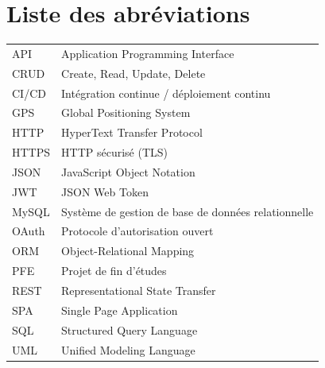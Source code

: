 \chapter*{Liste des abréviations}

\begin{tabular}{@{}p{3.2cm}p{11cm}@{}}
API & Application Programming Interface \\
CRUD & Create, Read, Update, Delete \\
CI/CD & Intégration continue / déploiement continu \\
GPS & Global Positioning System \\
HTTP & HyperText Transfer Protocol \\
HTTPS & HTTP sécurisé (TLS) \\
JSON & JavaScript Object Notation \\
JWT & JSON Web Token \\
MySQL & Système de gestion de base de données relationnelle \\
OAuth & Protocole d'autorisation ouvert \\
ORM & Object-Relational Mapping \\
PFE & Projet de fin d'études \\
REST & Representational State Transfer \\
SPA & Single Page Application \\
SQL & Structured Query Language \\
UML & Unified Modeling Language \\
\end{tabular}

\clearpage
